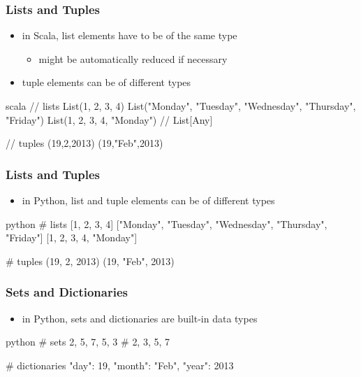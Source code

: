 \documentclass[dvipsnames]{beamer}
\theoremstyle{plain}
\begin{document}
\begin{frame}[fragile]
  \frametitle{Lists and Tuples}

  \begin{itemize}
    \item in Scala, list elements have to be of the same type
    \begin{itemize}
      \item might be automatically reduced if necessary
    \end{itemize}
    \item tuple elements can be of different types
  \end{itemize}

  \pause
  \begin{example}[Scala]
    \begin{pygments}{scala}
// lists
List(1, 2, 3, 4)
List("Monday", "Tuesday", "Wednesday", "Thursday", "Friday")
List(1, 2, 3, 4, "Monday")  // List[Any]

// tuples
(19,2,2013)
(19,"Feb",2013)
    \end{pygments}
  \end{example}
\end{frame}

\begin{frame}[fragile]
  \frametitle{Lists and Tuples}

  \begin{itemize}
    \item in Python, list and tuple elements can be of different types
  \end{itemize}

  \pause
  \begin{example}[Python]
    \begin{pygments}{python}
# lists
[1, 2, 3, 4]
["Monday", "Tuesday", "Wednesday", "Thursday", "Friday"]
[1, 2, 3, 4, "Monday"]

# tuples
(19, 2, 2013)
(19, "Feb", 2013)
    \end{pygments}
  \end{example}
\end{frame}

\begin{frame}[fragile]
  \frametitle{Sets and Dictionaries}

  \begin{itemize}
    \item in Python, sets and dictionaries are built-in data types
  \end{itemize}

  \pause
  \begin{example}[Python]
    \begin{pygments}{python}
# sets
{2, 5, 7, 5, 3}         # {2, 3, 5, 7}

# dictionaries
{"day": 19, "month": "Feb", "year": 2013}
    \end{pygments}
  \end{example}
\end{frame}
\end{document}
